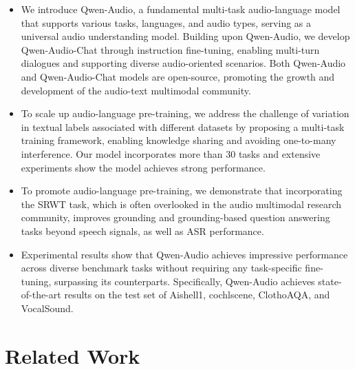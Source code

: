 \documentclass{article}
\begin{document}
\begin{itemize}
\item We introduce Qwen-Audio, a fundamental multi-task audio-language model that supports various tasks, languages, and audio types, serving as a universal audio understanding model. Building upon Qwen-Audio, we develop Qwen-Audio-Chat through instruction fine-tuning, enabling multi-turn dialogues and supporting diverse audio-oriented scenarios. Both Qwen-Audio and Qwen-Audio-Chat models are open-source, promoting the growth and development of the audio-text multimodal community. 
\item To scale up audio-language pre-training, we address the challenge of variation in textual labels associated with different datasets by proposing a multi-task training framework, enabling knowledge sharing and avoiding one-to-many interference. Our model incorporates more than 30 tasks and extensive experiments show the model achieves strong performance.
\item To promote audio-language pre-training, we demonstrate that incorporating the SRWT task, which is often overlooked in the audio multimodal research community, improves grounding and grounding-based question answering tasks beyond speech signals, as well as ASR performance.
\item Experimental results show that Qwen-Audio achieves impressive performance across diverse benchmark tasks without requiring any task-specific fine-tuning, surpassing its counterparts. Specifically, Qwen-Audio achieves state-of-the-art results on the test set of Aishell1, cochlscene, ClothoAQA, and VocalSound. 

\end{itemize}

\section{Related Work}
\label{sec:related_work}
\end{document}
